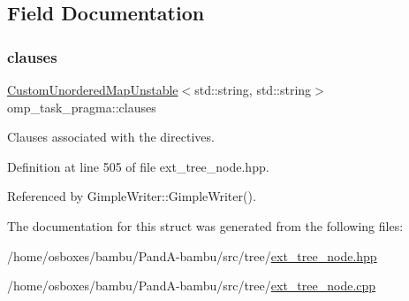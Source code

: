 \subsection{Field Documentation}
\mbox{\label{structomp__task__pragma_aa403449999fc8c28f6565bb87bfef116}} 
\subsubsection{\texorpdfstring{clauses}{clauses}}
{\footnotesize\ttfamily \hyperlink{custom__map_8hpp_a8cbaceffc09790a885ec7e9c17809c69}{Custom\+Unordered\+Map\+Unstable}$<$std\+::string, std\+::string$>$ omp\+\_\+task\+\_\+pragma\+::clauses}



Clauses associated with the directives. 



Definition at line 505 of file ext\+\_\+tree\+\_\+node.\+hpp.



Referenced by Gimple\+Writer\+::\+Gimple\+Writer().



The documentation for this struct was generated from the following files\+:\begin{DoxyCompactItemize}
\item 
/home/osboxes/bambu/\+Pand\+A-\/bambu/src/tree/\hyperlink{ext__tree__node_8hpp}{ext\+\_\+tree\+\_\+node.\+hpp}\item 
/home/osboxes/bambu/\+Pand\+A-\/bambu/src/tree/\hyperlink{ext__tree__node_8cpp}{ext\+\_\+tree\+\_\+node.\+cpp}\end{DoxyCompactItemize}
